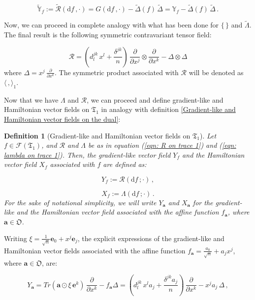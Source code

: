 \documentclass[11pt]{article}
\newcommand{\be}{\begin{equation}}
\newcommand{\ee}{\end{equation}}
\newcommand{\vsp}{\vspace{0.4cm}}
\newcommand{\obsp}{\mathfrak{O}}
\newtheorem{defn}{Definition}
\begin{document}
\be\label{eqn: gradient-like vector fields on the self-adjoint part of the dual of the algebra}
\widetilde{\mathbb{Y}}_{f}:=\widetilde{\mathcal{R}}\left(\mathrm{d}f\,,\cdot\right)=G\left(\mathrm{d}f\,,\cdot\right) -  \widetilde{\Delta}(f)\,\widetilde{\Delta}=\mathbb{Y}_{f} -  \widetilde{\Delta}(f)  \,\widetilde{\Delta}\,.
\ee

Now, we can proceed in complete analogy with what has been done for $\{\,\}$ and $\widetilde{\Lambda}$.
The final result is the following symmetric contravariant tensor field:

\be\label{eqn: R on trace 1}
\mathcal{R}=\left(d^{jk}_{l}\,x^{l} + \frac{\delta^{jk}}{n}\right)\,\frac{\partial}{\partial x^{j}}\otimes\frac{\partial}{\partial x^{k}} -   \Delta\otimes\Delta
\ee  
where $\Delta=x^{j}\,\frac{\partial}{\partial x^{k}}$.
The symmetric product associated with $\mathcal{R}$ will be denoted as $\langle\,,\rangle_{1}$.


\vsp


Now that we have $\Lambda$ and $\mathcal{R}$, we can proceed and define gradient-like and Hamiltonian vector fields on $\mathfrak{T}_{1}$ in analogy with definition \ref{Gradient-like and Hamiltonian vector fields on the dual}:

\begin{defn}[Gradient-like and Hamiltonian vector fields on $\mathfrak{T}_{1}$]\label{Gradient-like and Hamiltonian vector fields on the trace one}
Let $f\in\mathcal{F}(\mathfrak{T}_{1})$, and $\mathcal{R}$ and $\Lambda$ be as in equation (\ref{eqn: R on trace 1}) and (\ref{eqn: lambda on trace 1}).
Then, the gradient-like vector field $Y_{f}$ and the Hamiltonian vector field $X_{f}$ associated with $f$ are defined as:

\be
Y_{f}:=\mathcal{R}\left(\mathrm{d}f\,;\cdot\right)\,,
\ee

\be
X_{f}:=\Lambda\left(\mathrm{d}f\,;\cdot\right)\,.
\ee
For the sake of notational simplicity, we will write $Y_{\mathbf{a}}$ and $X_{\mathbf{a}}$ for the gradient-like and the Hamiltonian vector field associated with the affine function $f_{\mathbf{a}}$, where $\mathbf{a}\in\obsp$.
\end{defn}

Writing $\xi=\frac{1}{\sqrt{n}}\mathbf{e}_{0} + x^{j}\mathbf{e}_{j}$, the explicit expressions of the gradient-like and Hamiltonian vector fields associated with the affine function $f_{\mathbf{a}}=\frac{a_{0}}{\sqrt{n}} + a_{j}x^{j}$, where $\mathbf{a}\in\obsp$, are:

\be\label{eqn: gradient-like vector field on trace 1}
Y_{\mathbf{a}}=Tr\left(\mathbf{a}\odot\xi\,\mathbf{e}^{k}\right)\,\frac{\partial}{\partial x^{k}} - f_{\mathbf{a}}\Delta =\left(d^{jk}_{l}\,x^{l}a_{j} +   \frac{\delta^{jk}a_{j}}{n} \right)\,\frac{\partial}{\partial x^{k}} -  x^{j}a_{j} \,\Delta\,,
\ee
\end{document}
